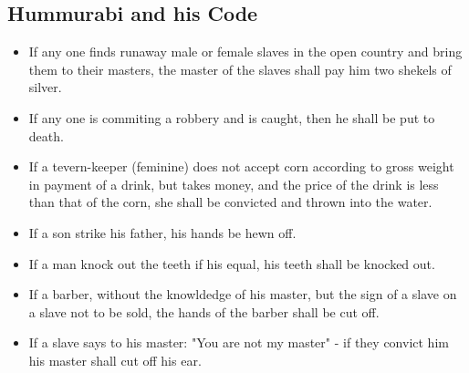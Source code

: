 \documentclass[11pt]{article}
\begin{document}
\subsection{Hummurabi and his Code}
\label{sec-3-5}
\begin{itemize}
\item If any one finds runaway male or female slaves in the open country and bring them to their masters, the master of the slaves shall pay him two shekels of silver.

\item If any one is commiting a robbery and is caught, then he shall be put to death.

\item If a tevern-keeper (feminine) does not accept corn according to gross weight in payment of a drink, but takes money, and the price of the drink is less than that of the corn, she shall be convicted and thrown into the water.

\item If a son strike his father, his hands be hewn off.

\item If a man knock out the teeth if his equal, his teeth shall be knocked out.

\item If a barber, without the knowldedge of his master, but the sign of a slave on a slave not to be sold, the hands of the barber shall be cut off.

\item If a slave says to his master: "You are not my master" - if they convict him his master shall cut off his ear.
\end{itemize}
\end{document}
